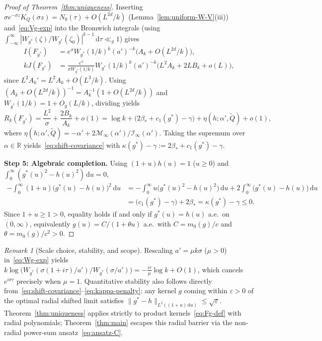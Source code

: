 \documentclass[11pt, reqno]{amsart}
\theoremstyle{remark}
\newtheorem{remark}[lemma]{Remark}
\numberwithin{equation}{section}
\newcommand{\R}{\mathbb{R}}
\newcommand{\dd}{\,\mathrm{d}}
\begin{document}
\begin{proof}[Proof of Theorem~\ref{thm:uniqueness}]
Inserting $\sigma e^{-\sigma z} K_Q(\sigma z) = N_0(\tau) + O(L^{2d}/k)$ (Lemma~\ref{lem:uniform-W-V}(iii)) and~\eqref{eq:Vg-exp}
into the Bromwich integrals (using $\int_{-\infty}^\infty |W_{g^*}(\zeta)/W_{g^*}(\zeta_0)|^{k-1}\dd\tau \ll_g 1$) gives
\begin{align*}
I(F_{g^*}) &= e^\sigma W_{g^*}(1/k)^k (a')^{-k} \bigl(A_k + O(L^{2d}/k)\bigr), \\
k J(F_{g^*}) &= \frac{e^\sigma}{\sigma W_{g^*}(1/k)} W_{g^*}(1/k)^k (a')^{-k} \bigl(L^2 A_k + 2L B_k + o(L)\bigr),
\end{align*}
since $L^2 A_k' = L^2 A_k + O(L^3/k)$. Using $(A_k + O(L^{2d}/k))^{-1} = A_k^{-1}(1 + O(L^{2d}/k))$ and
$W_{g^*}(1/k) = 1 + O_g(L/k)$, dividing yields
\[
R_k(F_{g^*}) = \frac{L^2}{\sigma} + \frac{2 B_k}{A_k} + o(1)
= \log k + \bigl(2\beta_* + c_1(g^*) - \gamma\bigr) + \eta(h; \alpha', \widetilde{Q}) + o(1),
\]
where $\eta(h; \alpha', \widetilde{Q}) = -\alpha' + 2\mathcal{M}_\infty(\alpha')/\mathcal{I}_\infty(\alpha')$.
Taking the supremum over $\alpha \in \R$ yields~\eqref{eq:shift-covariance} with $\kappa(g^*) - \gamma := 2\beta_* + c_1(g^*) - \gamma$.

\smallskip
\noindent\textbf{Step 5: Algebraic completion.}
Using $(1+u)h(u) = 1$ ($u \ge 0$) and $\int_0^\infty (g^*(u)^2 - h(u)^2)\dd u = 0$,
\begin{align*}
-\int_0^\infty (1+u)\bigl(g^*(u) - h(u)\bigr)^2 \dd u
&= -\int_0^\infty u\bigl(g^*(u)^2 - h(u)^2\bigr)\dd u + 2\int_0^\infty \bigl(g^*(u) - h(u)\bigr)\dd u \\
&= \bigl(c_1(g^*) - \gamma\bigr) + 2\beta_* = \kappa(g^*) - \gamma \le 0.
\end{align*}
Since $1+u \ge 1 > 0$, equality holds if and only if $g^*(u) = h(u)$ a.e.\ on $(0,\infty)$,
equivalently $g(u) = C/(1+\theta u)$ a.e.\ with $C = m_0(g)/c$ and $\theta = m_0(g)/c^2 > 0$.
\end{proof}

\begin{remark}[Scale choice, stability, and scope]
Rescaling $a' = \mu k\sigma$ ($\mu > 0$) in~\eqref{eq:Wg-exp} yields
$k\log\bigl(W_{g^*}(\sigma(1+i\tau)/a')/W_{g^*}(\sigma/a')\bigr) = -\frac{i\tau}{\mu}\log k + O(1)$,
which cancels $e^{i\sigma\tau}$ precisely when $\mu = 1$. Quantitative stability also follows directly
from~\eqref{eq:shift-covariance}--\eqref{eq:kappa-penalty}: any kernel $g$ coming within $\varepsilon > 0$
of the optimal radial shifted limit satisfies $\|g^* - h\|_{L^2((1+u)\dd u)} \le \sqrt{\varepsilon}$.
Theorem~\ref{thm:uniqueness} applies strictly to product kernels~\eqref{eq:Fg-def} with radial polynomials;
Theorem~\ref{thm:main} escapes this radial barrier via the non-radial power-sum ansatz~\eqref{eq:ansatz-C}.
\end{remark}
\end{document}
